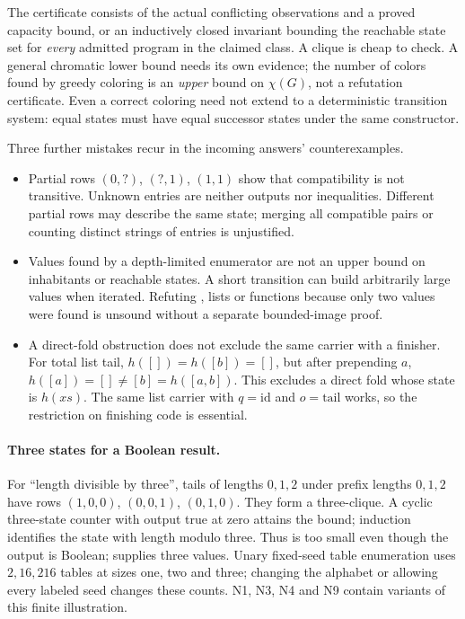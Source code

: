 The certificate consists of the actual conflicting observations and a proved
capacity bound, or an inductively closed invariant bounding the reachable
state set for \emph{every} admitted program in the claimed class. A clique is
cheap to check. A general chromatic lower bound needs its own evidence;
the number of colors found by greedy coloring is an \emph{upper} bound on
$\chi(G)$, not a refutation certificate. Even a correct coloring need not
extend to a deterministic transition system: equal states must have equal
successor states under the same constructor.

Three further mistakes recur in the incoming answers' counterexamples.
\begin{itemize}
\item Partial rows $(0,?)$, $(?,1)$, $(1,1)$ show that compatibility is not
transitive. Unknown entries are neither outputs nor inequalities. Different
partial rows may describe the same state; merging all compatible pairs or
counting distinct strings of entries is unjustified.
\item Values found by a depth-limited enumerator are not an upper bound on
inhabitants or reachable states. A short transition can build arbitrarily
large values when iterated. Refuting , lists or functions because
only two values were found is unsound without a separate bounded-image proof.
\item A direct-fold obstruction does not exclude the same carrier with a
finisher. For total list tail, $h([])=h([b])=[]$, but after prepending $a$,
$h([a])=[]\ne[b]=h([a,b])$. This excludes a direct fold whose state is
$h(xs)$. The same list carrier with $q=\mathrm{id}$ and $o=\mathrm{tail}$
works, so the restriction on finishing code is essential.
\end{itemize}

\paragraph{Three states for a Boolean result.}
For ``length divisible by three'', tails of lengths $0,1,2$ under prefix
lengths $0,1,2$ have rows
$(1,0,0)$, $(0,0,1)$, $(0,1,0)$. They form a three-clique. A cyclic
three-state counter with output true at zero attains the bound; induction
identifies the state with length modulo three. Thus  is too small
even though the output is Boolean;  supplies three values.
Unary fixed-seed table enumeration uses $2,16,216$ tables at sizes one, two
and three; changing the alphabet or allowing every labeled seed changes these
counts. N1, N3, N4 and N9 contain variants of this finite illustration.


